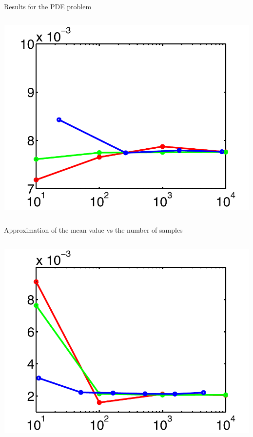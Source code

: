 \documentclass[final]{beamer}
\newcommand{\E}{\ensuremath{\mathbb{E}} } %
\newcommand{\bx}{\ensuremath{\mathbf{x}}} %
\begin{document}
\begin{frame}{}
{\begin{columns}[t]
\begin{column}{.30\linewidth}
\begin{block}{\centering Results for the PDE problem}
\begin{columns}[T]
\begin{column}{14cm}{}
\includegraphics[height=10cm, width = 14cm]{figures/exp11errors}\\
\end{column}
\end{columns}
\vspace{0.5em}
\centering\scriptsize{Approximation of the mean value vs the number of samples}
\vspace{-0.5em}
\begin{columns}[T]
\begin{column}{12cm}{}
\includegraphics[height=10cm, width = 14cm]{figures/semidev5errors}\\

\end{column}
\end{columns}
\end{block}
\end{column}
\end{columns}}
\end{frame}
\end{document}
